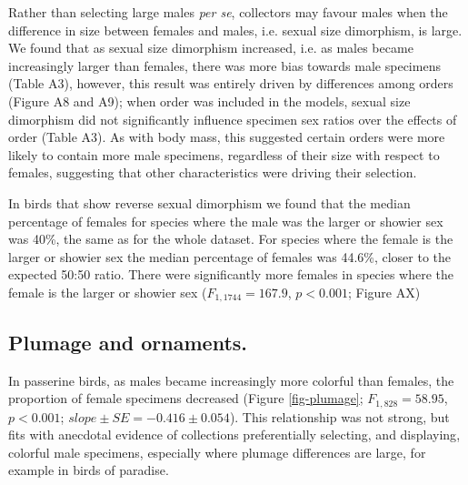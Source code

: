 \documentclass[a4paper, 12pt]{article}
\begin{document}
Rather than selecting large males \textit{per se}, collectors may favour males when the difference in size between females and males, i.e. sexual size dimorphism, is large. 
We found that as sexual size dimorphism increased, i.e. as males became increasingly larger than females, there was more bias towards male specimens (Table A3), however, this result was entirely driven by differences among orders (Figure A8 and A9); when order was included in the models, sexual size dimorphism did not significantly influence specimen sex ratios over the effects of order (Table A3). 
As with body mass, this suggested certain orders were more likely to contain more male specimens, regardless of their size with respect to females, suggesting that other characteristics were driving their selection.

In birds that show reverse sexual dimorphism we found that the median percentage of females for species where the male was the larger or showier sex was 40\%, the same as for the whole dataset. 
For species where the female is the larger or showier sex the median percentage of females was 44.6\%, closer to the expected 50:50 ratio.
 There were significantly more females in species where the female is the larger or showier sex ($F_{1, 1744} = 167.9$, $p < 0.001$; Figure AX)

\subsection{Plumage and ornaments.} 
In passerine birds, as males became increasingly more colorful than females, the proportion of female specimens decreased (Figure \ref{fig-plumage}; $F_{1, 828} = 58.95$, $p < 0.001$; $slope \pm SE = -0.416 \pm 0.054$). 
This relationship was not strong, but fits with anecdotal evidence of collections preferentially selecting, and displaying\cite{machin2008}, colorful male specimens, especially where plumage differences are large, for example in birds of paradise. 
\end{document}
